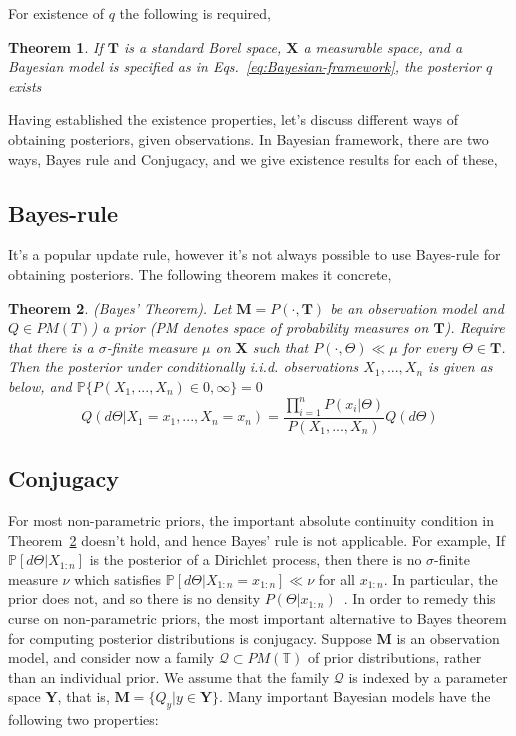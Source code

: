 \documentclass[10pt]{article}
\newtheorem{thm}{Theorem}
\newcommand{\Prob}{\mathbb{P}}
\begin{document}
For existence of $q$ the following is required,

\begin{thm}
If $\mathbf{T}$ is a standard Borel space, $\mathbf{X}$ a measurable space, and a Bayesian model is specified as in Eqs.~\ref{eq:Bayesian-framework}, the posterior $q$ exists
\end{thm}

Having established the existence properties, let's discuss different ways of obtaining posteriors, given observations. In Bayesian framework, there are two ways, Bayes rule and Conjugacy, and we give existence results for each of these,

\subsection{Bayes-rule}
\label{subsec:Bayes_rule}
It's a popular update rule, however it's not always possible to use Bayes-rule for obtaining posteriors. The following theorem makes it concrete,

\begin{thm}\label{thm:Bayes-rule}
(Bayes’ Theorem). Let $\mathbf{M} = P( \cdot , \mathbf{T})$ be an observation model and $Q \in PM(T) $) a prior (PM denotes space of probability measures on $\mathbf{T}$). Require that there is a $\sigma$-finite measure $\mu$ on $\mathbf{X}$ such that $P( \cdot , \Theta) \ll \mu$ for every $\Theta \in \mathbf{T}$. Then the posterior under conditionally i.i.d. observations $X_{1}, ..., X_{n}$ is given as below, and $\Prob\{{P(X_{1},...,X_{n}) \in {0,\infty}}\} = 0$
\[ Q(d\Theta|X_{1}=x_{1},. . ., X_{n}=x_{n}) = \frac{\prod_{i=1}^{n} P(x_{i}|\Theta)}{P(X_{1},. . .,X_{n})} Q(d\Theta)  \]
\end{thm}
\subsection{Conjugacy}
\label{subsec:conjugacy}

For most non-parametric priors, the important absolute continuity  condition in Theorem~\ref{thm:Bayes-rule} doesn't hold, and hence Bayes' rule is not applicable. For example, If $\mathbb{P}[d\Theta|X_{1:n}]$ is the posterior of a Dirichlet process, then there is no $\sigma$-finite measure $\nu$ which satisfies $\mathbb{P}[d\Theta|X_{1:n} = x_{1:n}] \ll \nu$ for all $x_{1:n}$. In particular, the prior does not, and so there is no density $P(\Theta|x_{1:n})$~\citep{ghosal2017fundamentals}. In order to remedy this curse on non-parametric priors, the most important alternative to Bayes theorem for computing posterior distributions is conjugacy. Suppose $\mathbf{M}$ is an observation model, and consider now a family $\mathcal{Q} \subset PM(\mathbb T)$ of prior distributions, rather than an individual prior. We assume that the family $\mathcal{Q}$ is indexed by a parameter space $\mathbf{Y}$, that is, $\mathbf{M} = \{Q_y|y \in \mathbf{Y}\}$. Many important Bayesian models have the following two properties:
\end{document}

